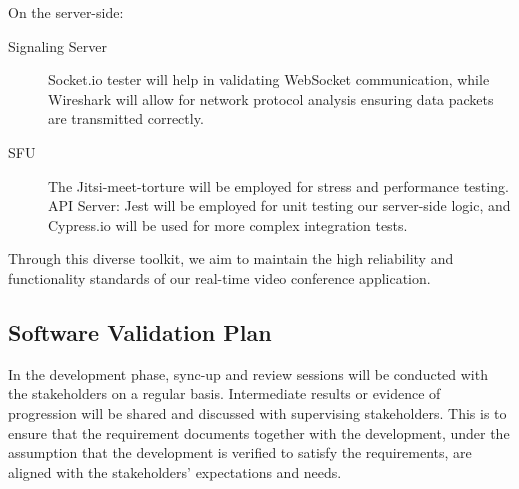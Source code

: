 \documentclass[12pt, titlepage]{article}
\begin{document}
On the server-side:
\begin{description}
\item[Signaling Server] Socket.io tester will help in validating WebSocket
  communication, while Wireshark will allow for network protocol analysis
  ensuring data packets are transmitted correctly.
\item[SFU] The Jitsi-meet-torture will be employed for stress and performance
  testing. API Server: Jest will be employed for unit testing our server-side
  logic, and Cypress.io will be used for more complex integration tests.
\end{description}

Through this diverse toolkit, we aim to maintain the high reliability and
functionality standards of our real-time video conference application.


\subsection{Software Validation Plan}

In the development phase, sync-up and review sessions will be conducted with the
stakeholders on a regular basis. Intermediate results or evidence of progression
will be shared and discussed with supervising stakeholders. This is to ensure
that the requirement documents together with the development, under the
assumption that the development is verified to satisfy the requirements, are
aligned with the stakeholders’ expectations and needs.
\end{document}
